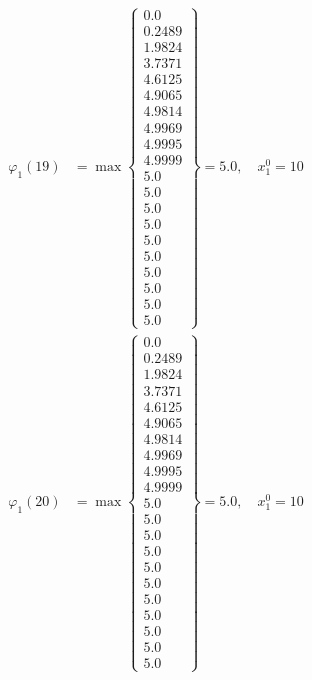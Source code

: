 \documentclass{article}
\begin{document}
\begin{align*}
\varphi_{1}(19) &= \max \left\{ \begin{array}{c}
0.0 \\
 0.2489 \\
 1.9824 \\
 3.7371 \\
 4.6125 \\
 4.9065 \\
 4.9814 \\
 4.9969 \\
 4.9995 \\
 4.9999 \\
 5.0 \\
 5.0 \\
 5.0 \\
 5.0 \\
 5.0 \\
 5.0 \\
 5.0 \\
 5.0 \\
 5.0 \\
 5.0
\end{array} \right\}=5.0, \quad x_{1}^0=10\\
  
\varphi_{1}(20) &= \max \left\{ \begin{array}{c}
0.0 \\
 0.2489 \\
 1.9824 \\
 3.7371 \\
 4.6125 \\
 4.9065 \\
 4.9814 \\
 4.9969 \\
 4.9995 \\
 4.9999 \\
 5.0 \\
 5.0 \\
 5.0 \\
 5.0 \\
 5.0 \\
 5.0 \\
 5.0 \\
 5.0 \\
 5.0 \\
 5.0 \\
 5.0
\end{array} \right\}=5.0, \quad x_{1}^0=10\\
  

\end{align*}
\end{document}
